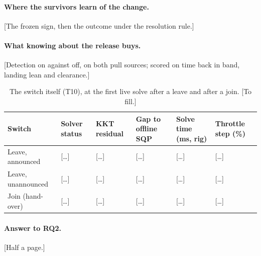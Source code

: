 \paragraph{Where the survivors learn of the change.} [The frozen sign, then the outcome under the resolution rule.]


\paragraph{What knowing about the release buys.} [Detection on against off, on both pull sources; scored on time back
in band, landing lean and clearance.]

\begin{table}[htbp]
  \centering
  \footnotesize
  \caption{The switch itself (T10), at the first live solve after a leave and after a join. [To fill.]}
  \label{tab:T10}
  \begin{tabularx}{\textwidth}{YYYYYY}
    \toprule
    Switch & Solver status & KKT residual & Gap to offline SQP & Solve time (ms, rig) & Throttle step (\%) \\
    \midrule
    Leave, announced & [\dots] & [\dots] & [\dots] & [\dots] & [\dots] \\
    Leave, unannounced & [\dots] & [\dots] & [\dots] & [\dots] & [\dots] \\
    Join (hand-over) & [\dots] & [\dots] & [\dots] & [\dots] & [\dots] \\
    \bottomrule
  \end{tabularx}
\end{table}

\paragraph{Answer to RQ2.} [Half a page.]
